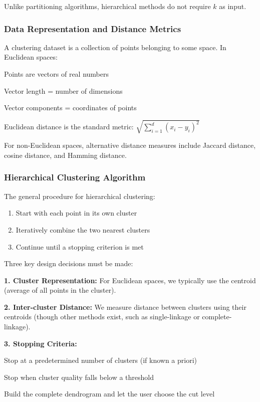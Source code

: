     Unlike partitioning algorithms, hierarchical methods do not require $k$ as input.
    
    \subsubsection{Data Representation and Distance Metrics}
    
    A clustering dataset is a collection of points belonging to some space. In Euclidean spaces:
    \begin{compactitemize}
        \item Points are vectors of real numbers
        \item Vector length = number of dimensions
        \item Vector components = coordinates of points
        \item Euclidean distance is the standard metric: $\sqrt{\sum_{i=1}^{d}(x_i - y_i)^2}$
    \end{compactitemize}
    
    For non-Euclidean spaces, alternative distance measures include Jaccard distance, cosine distance, and Hamming distance.
    
    \subsubsection{Hierarchical Clustering Algorithm}
    
    The general procedure for hierarchical clustering:
    \begin{enumerate}
        \item Start with each point in its own cluster
        \item Iteratively combine the two nearest clusters
        \item Continue until a stopping criterion is met
    \end{enumerate}
    
    Three key design decisions must be made:
    
    \textbf{1. Cluster Representation:} For Euclidean spaces, we typically use the centroid (average of all points in the cluster).
    
    \textbf{2. Inter-cluster Distance:} We measure distance between clusters using their centroids (though other methods exist, such as single-linkage or complete-linkage).
    
    \textbf{3. Stopping Criteria:}
    \begin{compactitemize}
        \item Stop at a predetermined number of clusters (if known a priori)
        \item Stop when cluster quality falls below a threshold
        \item Build the complete dendrogram and let the user choose the cut level
    \end{compactitemize}
    

